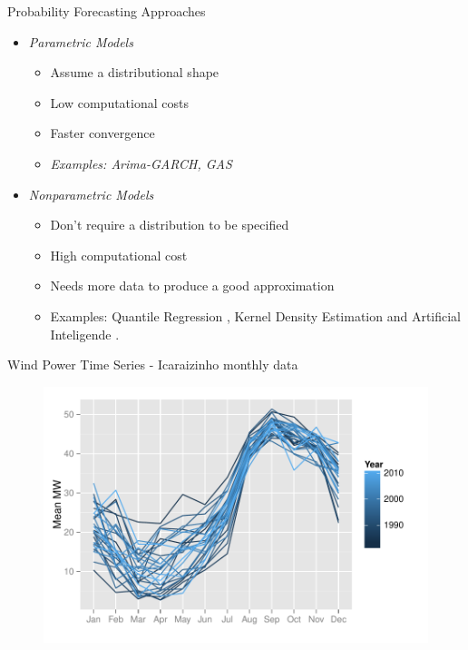 \begin{frame}{Probability Forecasting Approaches}

	\begin{itemize}

	\item
	\emph{Parametric Models}

	\begin{itemize}
		
		\item
		Assume a distributional shape
		\item
		Low computational costs
		\item
		Faster convergence
		\item
		\emph{Examples: Arima-GARCH, GAS}
	\end{itemize}
	\item
	\emph{Nonparametric Models}

	\begin{itemize}
		
		\item
		Don't require a distribution to be specified
		\item
		High computational cost
		\item
		Needs more data to produce a good approximation

		\item Examples: Quantile Regression \cite{koenker1978regression}, Kernel Density Estimation \cite{gallego2016line} and Artificial Inteligende \cite{Wan2017}.
	\end{itemize}
	\end{itemize}

\end{frame}


\begin{frame}{Wind Power Time Series - Icaraizinho monthly data}

	\begin{figure}
	\centering
	\includegraphics[width=0.9\linewidth]{Images/icaraizinho-mensal}
	\end{figure}

\end{frame}


